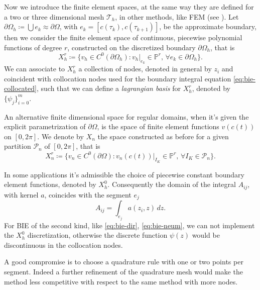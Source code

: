 \documentclass[10pt, a4paper]{article} %
\numberwithin{equation}{section}
\theoremstyle{definition}
\theoremstyle{plain}
\theoremstyle{plain}
\theoremstyle{plain}
\theoremstyle{plain}
\theoremstyle{plain}
\theoremstyle{plain}
\theoremstyle{plain}
\theoremstyle{plain}
\begin{document}
Now we introduce the finite element spaces, at the same way they 
are defined for a two or three dimensional mesh $\mathcal{T}_h$,
in other methods, like FEM
(see \cite{Quarteroni:book}).
Let $\partial\Omega_h \coloneqq \bigcup e_k\approx\partial\Omega$, 
with $e_k = [c(\tau_k), c(\tau_{k+1})]$, be the approximate boundary,
then
we consider the finite element space of continuous, piecewise polynomial functions of degree $r$,
constructed on the discretized boundary $\partial\Omega_h$, that is
\begin{equation}
 X^r_h \coloneqq \{v_h\in C^0(\partial\Omega_h):v_h|_{e_k} \in \mathbb{P}^r,\, \forall e_k\in \partial\Omega_h\}.
\end{equation}
We can associate to $X^r_h$ a collection of nodes, denoted in general by $z_i$ and 
coincident with collocation nodes used for the boundary integral equation \eqref{eq:bie-collocated}, 
such that we can define a \emph{lagrangian basis} for $X^r_h$,
denoted by $\{\psi_j\}_{i=0}^m$.
\par
An alternative finite dimensional space for regular domains, 
when it's given the explicit parametrization of $\partial \Omega$,
is the space of finite element functions $v(c(t))$ on $[0,2\pi]$.
We denote by $X_n$ the space constructed as before
for a given partition $\mathcal{P}_n$ of $[0, 2\pi]$, that is
\begin{equation}
 X^r_n \coloneqq \{v_n\in C^0(\partial\Omega):v_n(c(t))|_{I_K} \in \mathbb{P}^r,\, \forall I_K\in \mathcal{P}_n\}.
\end{equation}
\par
In some applications it's admissible the choice of piecewise constant boundary
element functions, denoted by $X^0_h$. Consequently the domain of the integral $A_{ij}$,
with kernel $a$, coincides with the segment $e_j$
\begin{equation}
\label{eq:Aij-X0h}
 A_{ij} = \int_{e_j}a(z_i,z)\,dz.
\end{equation}
For BIE of the second kind, like \eqref{eq:bie-dir}, \eqref{eq:bie-neum},
we can not implement the $X^0_h$ discretization, otherwise the discrete function $\psi(z)$
would be discontinuous in the collocation nodes.
\par
A good compromise is to choose a quadrature rule with one or two points per
segment. Indeed a further refinement of the quadrature mesh would make the method less
competitive with respect to the same method with more nodes.
\end{document}
